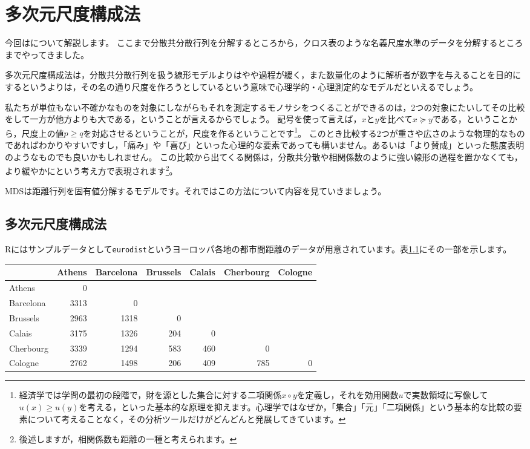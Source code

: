 \documentclass{ltjsbook}
\begin{document}
 
\chapter{多次元尺度構成法}
\label{chapter15} 
今回はについて解説します。
ここまで分散共分散行列を分解するところから，クロス表のような名義尺度水準のデータを分解するところまでやってきました。

多次元尺度構成法は，分散共分散行列を扱う線形モデルよりはやや過程が緩く，また数量化のように解析者が数字を与えることを目的にするというよりは，その名の通り尺度を作ろうとしているという意味で心理学的・心理測定的なモデルだといえるでしょう。

私たちが単位もない不確かなものを対象にしながらもそれを測定するモノサシをつくることができるのは，2つの対象にたいしてその比較をして一方が他方よりも大である，ということが言えるからでしょう。
記号を使って言えば，$x$と$y$を比べて$x \succeq y$である，ということから，尺度上の値$p \ge q$を対応させるということが，尺度を作るということです\footnote{経済学では学問の最初の段階で，財を源とした集合に対する二項関係$x \circ y$を定義し，それを効用関数$u$で実数領域に写像して$u(x) \ge u(y)$を考える，といった基本的な原理を抑えます。心理学ではなぜか，「集合」「元」「二項関係」という基本的な比較の要素について考えることなく，その分析ツールだけがどんどんと発展してきています。}。
このとき比較する2つが重さや広さのような物理的なものであればわかりやすいですし，「痛み」や「喜び」といった心理的な要素であっても構いません。あるいは「より賛成」といった態度表明のようなものでも良いかもしれません。
この比較から出てくる関係は，分散共分散や相関係数のように強い線形の過程を置かなくても，より緩やかにという考え方で表現されます\footnote{後述しますが，相関係数も距離の一種と考えられます。}。

MDSは距離行列を固有値分解するモデルです。それではこの方法について内容を見ていきましょう。

\section{多次元尺度構成法}
Rにはサンプルデータとして\texttt{eurodist}というヨーロッパ各地の都市間距離のデータが用意されています。表\ref{tbl::15_01}にその一部を示します。

\begin{table}[ht]
    \centering
    \begin{tabular}{l|rrrrrr}
    \hline
      & Athens & Barcelona & Brussels & Calais & Cherbourg & Cologne\\
    \hline
    Athens & 0 &  &  &  &  & \\
    Barcelona & 3313 & 0 & &  &  & \\
    Brussels & 2963 & 1318 & 0 &  &  & \\
    Calais & 3175 & 1326 & 204 & 0 &  & \\
    Cherbourg & 3339 & 1294 & 583 & 460 & 0 & \\
    Cologne & 2762 & 1498 & 206 & 409 & 785 & 0\\
    \hline
    \end{tabular}
    \label{tbl::15_01}
\end{table}
\end{document}
